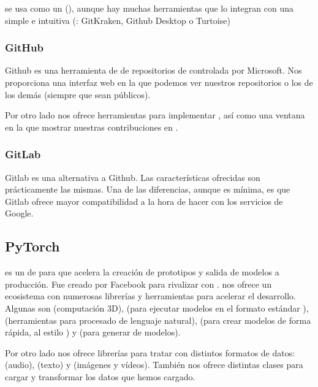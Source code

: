  se usa como un  (), aunque hay muchas herramientas que lo integran con una  simple e intuitiva (\pe: GitKraken, Github Desktop o Turtoise)

\subsubsection{GitHub}

Github es una herramienta de  de repositorios de  controlada por Microsoft. Nos proporciona una interfaz web en la que podemos ver nuestros repositorios o los de los demás (siempre que sean públicos).

Por otro lado nos ofrece herramientas para implementar , así como una ventana en la que mostrar nuestras contribuciones en .


\subsubsection{GitLab}

Gitlab es una alternativa a Github. Las características ofrecidas son prácticamente las mismas. Una de las diferencias, aunque es mínima, es que Gitlab ofrece mayor compatibilidad a la hora de hacer  con los servicios de Google.


\subsection{PyTorch}

 es un  de  para  que acelera la creación de prototipos y salida de modelos a producción. Fue creado por Facebook para rivalizar con .  nos ofrece un ecosistema con numerosas librerías y herramientas para acelerar el desarrollo. Algunas son  (computación 3D),  (para ejecutar modelos en el formato estándar ),  (herramientas para procesado de lenguaje natural),  (para crear modelos de forma rápida, al estilo ) y  (para generar  de modelos).

Por otro lado nos ofrece librerías para tratar con distintos formatos de datos:  (audio),  (texto) y  (imágenes y vídeos). También nos ofrece distintas clases para cargar   y transformar los datos que hemos cargado.

